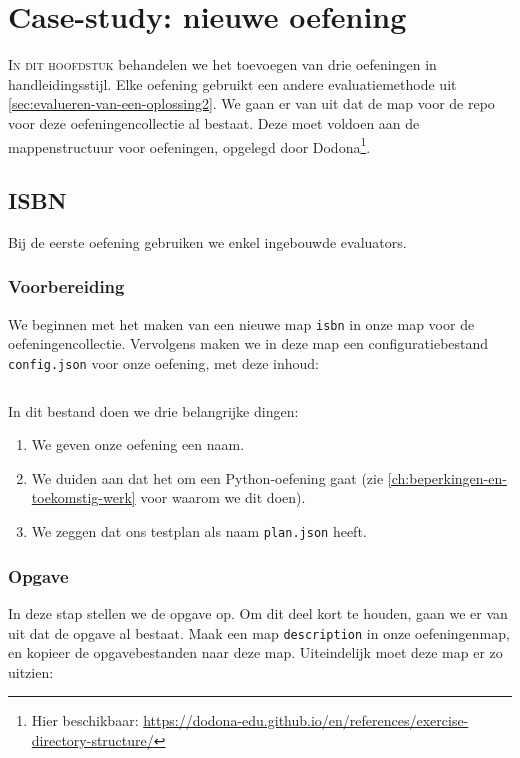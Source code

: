 \chapter{Case-study: nieuwe oefening}\label{ch:nieuwe-oefening}

\lettrine{I}{n dit hoofdstuk} behandelen we het toevoegen van drie oefeningen in handleidingsstijl.
Elke oefening gebruikt een andere evaluatiemethode uit \cref{sec:evalueren-van-een-oplossing2}.
We gaan er van uit dat de map voor de repo voor deze oefeningencollectie al bestaat.
Deze moet voldoen aan de mappenstructuur voor oefeningen, opgelegd door Dodona\footnote{Hier beschikbaar: \url{https://dodona-edu.github.io/en/references/exercise-directory-structure/}}.

\section{ISBN}\label{sec:isbn}

Bij de eerste oefening gebruiken we enkel ingebouwde evaluators.

\subsection{Voorbereiding}\label{subsec:voorbereiding}

We beginnen met het maken van een nieuwe map \texttt{isbn} in onze map voor de oefeningencollectie.
Vervolgens maken we in deze map een configuratiebestand \texttt{config.json} voor onze oefening, met deze inhoud:

\inputminted{json}{../../exercise/isbn/config-clean.json}

In dit bestand doen we drie belangrijke dingen:
\begin{enumerate}
    \item We geven onze oefening een naam.
    \item We duiden aan dat het om een Python-oefening gaat (zie \cref{ch:beperkingen-en-toekomstig-werk} voor waarom we dit doen).
    \item We zeggen dat ons testplan als naam \texttt{plan.json} heeft.
\end{enumerate}

\subsection{Opgave}\label{subsec:opgave}

In deze stap stellen we de opgave op.
Om dit deel kort te houden, gaan we er van uit dat de opgave al bestaat.
Maak een map \texttt{description} in onze oefeningenmap, en kopieer de opgavebestanden naar deze map.
Uiteindelijk moet deze map er zo uitzien:

